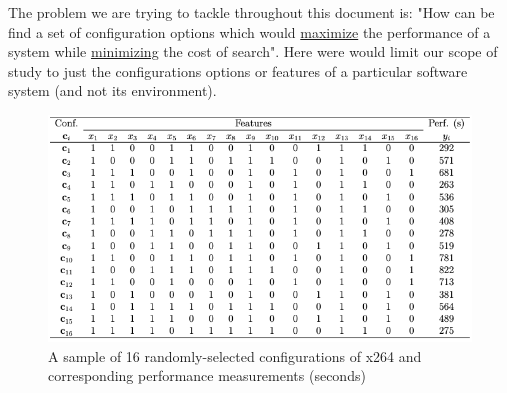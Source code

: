 The problem we are trying to tackle throughout this document is: "How can be find a set of configuration options which would \underline{maximize} the performance of a system while \underline{minimizing} the cost of search". Here were would limit our scope of study to just the configurations options or features of a particular software system (and not its environment). 

\begin{figure}[!htbp]
    \centering
    \includegraphics[width=0.8\linewidth]{Figures/table.png}
    \caption{A sample of 16 randomly-selected configurations of x264 and corresponding
performance measurements (seconds)}
    \label{fig:chap1_random_sample}
\end{figure}

